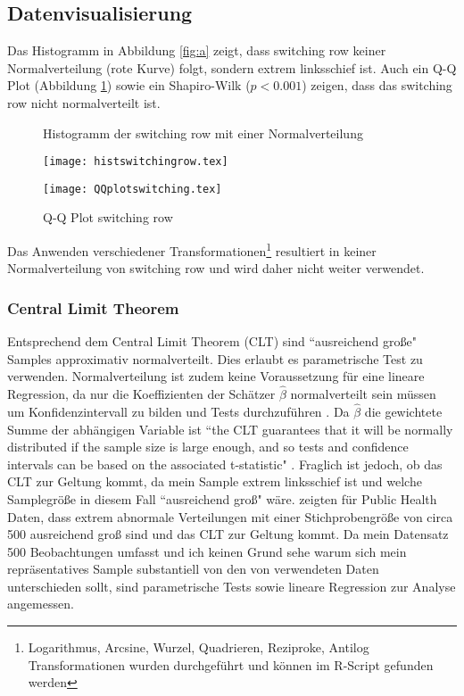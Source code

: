 \documentclass[11pt,a4paper]{article}
\begin{document}
\subsection{Datenvisualisierung}
Das Histogramm in Abbildung \ref{fig:a} zeigt, dass switching row keiner Normalverteilung (rote Kurve) folgt, sondern extrem linksschief ist. Auch ein Q-Q Plot (Abbildung \ref{fig:b}) sowie ein Shapiro-Wilk ($p < 0.001$) zeigen, dass das switching row nicht normalverteilt ist. 

\begin{figure}
    \centering
    \begin{minipage}{0.45\textwidth}
\caption{Histogramm der switching row mit einer Normalverteilung}\label{fig:a}
        \texttt{[image: histswitchingrow.tex]} %
        
    \end{minipage}\hfill
    \begin{minipage}{0.45\textwidth}
\caption{Q-Q Plot switching row}\label{fig:b}
        \texttt{[image: QQplotswitching.tex]} %
        
    \end{minipage}
\end{figure}

Das Anwenden verschiedener Transformationen\footnote{Logarithmus, Arcsine, Wurzel, Quadrieren, Reziproke, Antilog Transformationen wurden durchgeführt und können im R-Script gefunden werden} resultiert in keiner Normalverteilung von switching row und wird daher nicht weiter verwendet.\\

\subsubsection{Central Limit Theorem}
Entsprechend dem Central Limit Theorem (CLT) sind “ausreichend große" Samples approximativ normalverteilt. Dies erlaubt es parametrische Test zu verwenden. Normalverteilung ist zudem keine Voraussetzung für eine lineare Regression, da nur die Koeffizienten der Schätzer $\hat{\beta}$ normalverteilt sein müssen um Konfidenzintervall zu bilden und Tests durchzuführen \parencite{lumley2002importance}. Da $\hat{\beta}$ die gewichtete Summe der abhängigen Variable ist “the CLT guarantees that it will be normally distributed if the sample size is large enough, and so tests and confidence intervals can be based on the associated t-statistic" \parencite{lumley2002importance}. Fraglich ist jedoch, ob das CLT zur Geltung kommt, da mein Sample extrem linksschief ist und welche Samplegröße in diesem Fall “ausreichend groß" wäre. \textcite{lumley2002importance} zeigten für Public Health Daten, dass extrem abnormale Verteilungen mit einer Stichprobengröße von circa 500 ausreichend groß sind und das CLT zur Geltung kommt. Da mein Datensatz 500 Beobachtungen umfasst und ich keinen Grund sehe warum sich mein repräsentatives Sample substantiell von den von \textcite{lumley2002importance} verwendeten Daten unterschieden sollt, sind parametrische Tests sowie lineare Regression zur Analyse angemessen.
\end{document}
